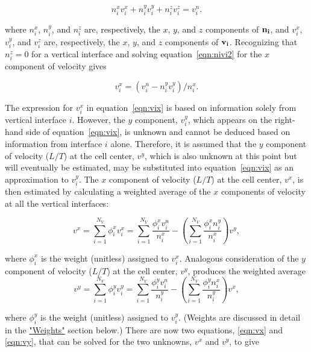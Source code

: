 \begin{equation}
\label{eqn:nivi2}
n_i^x v_i^x + n_i^y v_i^y + n_i^z v_i^z = v_i^n.
\end{equation}

\noindent where $n_i^x$, $n_i^y$, and $n_i^z$ are, respectively, the $x$, $y$, and $z$ components of $\mathbf{n_i}$, and $v_i^x$, $v_i^y$, and $v_i^z$ are, respectively, the $x$, $y$, and $z$ components of $\mathbf{v_i}$. Recognizing that $n_i^z = 0$  for a vertical interface and solving equation~\ref{eqn:nivi2} for the $x$ component of velocity gives

\begin{equation}
\label{eqn:vix}
v_i^x = \left ( v_i^n - n_i^y v_i^y \right ) / n_i^x.
\end{equation}

\noindent The expression for $v_i^x$ in equation~\ref{eqn:vix} is based on information solely from vertical interface $i$. However, the $y$ component, $v_i^y$, which appears on the right-hand side of equation~\ref{eqn:vix}, is unknown and cannot be deduced based on information from interface $i$ alone. Therefore, it is assumed that the $y$ component of velocity ($L/T$) at the cell center, $v^y$, which is also unknown at this point but will eventually be estimated, may be substituted into equation~\ref{eqn:vix} as an approximation to $v_i^y$. The $x$ component of velocity ($L/T$) at the cell center, $v^x$, is then estimated by calculating a weighted average of the $x$ components of velocity at all the vertical interfaces:

\begin{equation}
\label{eqn:vx}
v^x = \sum_{i=1}^{N_V} \phi_i^x v_i^x = \sum_{i=1}^{N_V} \frac{\phi_i^x v_i^n}{n_i^x} - \left( \sum_{i=1}^{N_V} \frac{\phi_i^x n_i^y}{n_i^x}  \right ) v^y,
\end{equation}

\noindent where $\phi_i^x$ is the weight (unitless) assigned to $v_i^x$. Analogous consideration of the $y$ component of velocity ($L/T$) at the cell center, $v^y$, produces the weighted average
\begin{equation}
\label{eqn:vy}
v^y = \sum_{i=1}^{N_V} \phi_i^y v_i^y = \sum_{i=1}^{N_V} \frac{\phi_i^y v_i^n}{n_i^y} - \left( \sum_{i=1}^{N_V} \frac{\phi_i^y n_i^x}{n_i^y}  \right ) v^x,
\end{equation}

\noindent where $\phi_i^y$ is the weight (unitless) assigned to $v_i^y$. (Weights are discussed in detail in the \hyperref[sec:weights]{"Weights"} section below.) There are now two equations, \ref{eqn:vx} and \ref{eqn:vy}, that can be solved for the two unknowns, $v^x$ and $v^y$, to give

